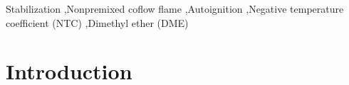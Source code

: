 \documentclass[review,3p,times]{elsarticle}
\begin{document}
\begin{frontmatter}
\begin{abstract}
\end{abstract}

\begin{keyword} 
Stabilization \sep Nonpremixed coflow flame \sep Autoignition \sep Negative temperature coefficient (NTC) \sep Dimethyl ether (DME) 
\end{keyword}

\end{frontmatter}



\section{Introduction}

\end{document}
